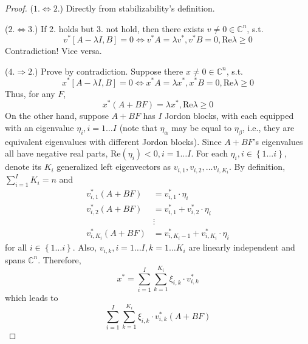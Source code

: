 \documentclass[
]{book}
\theoremstyle{definition}
\theoremstyle{definition}
\theoremstyle{definition}
\theoremstyle{definition}
\theoremstyle{remark}
\begin{document}
\begin{proof}
(\(1. \Leftrightarrow 2.\)) Directly from stabilizability's definition.

(\(2. \Leftrightarrow 3.\)) If 2. holds but 3. not hold, then there exists \(v \ne 0 \in \mathbb{C}^n\), s.t.
\begin{equation*}
   v^* [A-\lambda I, B] = 0 \Leftrightarrow v^* A = \lambda v^*, v^* B = 0, \text{Re} \lambda \ge 0
\end{equation*}
Contradiction! Vice versa.

(\(4. \Rightarrow 2.\)) Prove by contradiction. Suppose there \(x \ne 0 \in \mathbb{C}^n\), s.t.
\begin{equation*}
   x^* [A-\lambda I, B] = 0 \Leftrightarrow x^* A = \lambda x^*, x^* B = 0, \text{Re} \lambda \ge 0
\end{equation*}
Thus, for any \(F\),
\begin{equation*}
   x^* (A+BF) = \lambda x^*, \text{Re} \lambda \ge 0
\end{equation*}
On the other hand, suppose \(A+BF\) has \(I\) Jordon blocks, with each equipped with an eigenvalue \(\eta_i, i = 1\dots I\) (note that \(\eta_\alpha\) may be equal to \(\eta_\beta\), i.e., they are equivalent eigenvalues with different Jordon blocks). Since \(A+BF\)'s eigenvalues all have negative real parts, \(\text{Re} (\eta_i) < 0, i = 1\dots I\). For each \(\eta_i,i \in \left\{1\dots i\right\}\), denote its \(K_i\) generalized left eigenvectors as \(v_{i,1}, v_{i,2}, \dots v_{i,K_i}\). By definition, \(\sum_{i=1}^{I} K_i = n\) and\\
\begin{equation*}
   \begin{split}
      v_{i,1}^* (A+BF) & = v_{i,1}^* \cdot \eta_i \\
      v_{i,2}^* (A+BF) & = v_{i,1}^* + v_{i,2}^* \cdot \eta_i \\
      & \vdots \\
      v_{i,K_i}^* (A+BF) & = v_{i,K_i-1}^* + v_{i,K_i}^* \cdot \eta_i
   \end{split}
\end{equation*}
for all \(i \in \left\{1\dots i\right\}\). Also, \(v_{i,k},i=1\dots I, k=1\dots K_i\) are linearly independent and spans \(\mathbb{C}^n\). Therefore,
\begin{equation*}
   x^* = \sum_{i=1}^{I} \sum_{k=1}^{K_i} \xi_{i,k} \cdot v_{i,k}^*
\end{equation*}
which leads to
\begin{equation*}
   \sum_{i=1}^{I} \sum_{k=1}^{K_i} \xi_{i,k} \cdot v_{i,k}^* (A+BF) 

\end{equation*}
\end{proof}
\end{document}

